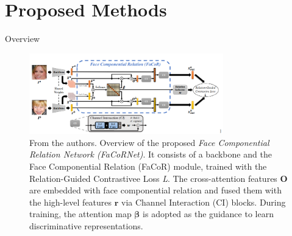 \documentclass[aspectratio=169,xcolor=dvipsnames]{beamer}
\begin{document}
\section{Proposed Methods}

\begin{frame}{Overview}
\begin{figure}
    \centering
    \includegraphics[width=0.75\textwidth]{imgs/F2.png}
        \caption{From the authors. Overview of the proposed \textit{Face Componential Relation Network (FaCoRNet)}. It consists of a backbone and the Face Componential Relation (FaCoR) module, trained with the Relation-Guided Contrastivee Loss \textit{L}. The cross-attention features $\mathbf{O}$ are embedded with face componential relation and fused them with the high-level features $\mathbf{r}$ via Channel Interaction (CI) blocks. During training, the attention map $\mathbf{\beta}$ is adopted as the guidance to learn discriminative representations.}
        \label{fig:model-overview}
    \end{figure}
\end{frame}

\end{document}

